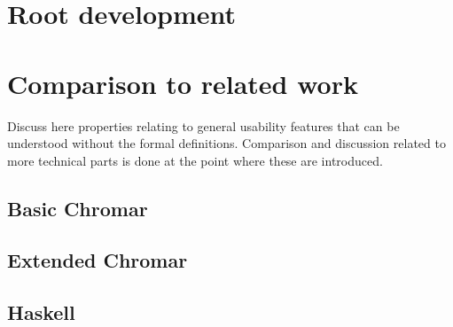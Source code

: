\documentclass[phd]{infthesis}
\begin{document}
\section{Root development}

\section{Comparison to related work}
Discuss here properties relating to general usability features that can be
understood without the formal definitions. Comparison and discussion related to
more technical parts is done at the point where these are introduced.

\subsection{Basic Chromar}

\subsection{Extended Chromar}

\subsection{Haskell}


\singlespace


\printbibliography[heading=bibintoc]

\end{document}
